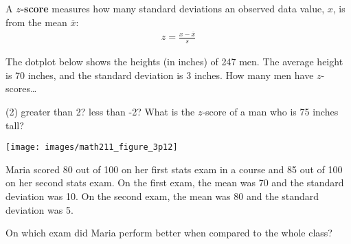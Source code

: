 \documentclass[../mathNotesPreamble]{subfiles}
\begin{document}
  \begin{defn*}
    A \textbf{$z$-score} measures how many standard deviations an observed data value, $x$, is from the mean $\overline{x}$:
    \begin{align*}
      z=\frac{x-\overline{x}}{s}
    \end{align*}
  \end{defn*}

  \begin{ex*}
    The dotplot below shows the heights (in inches) of 247 men. The average height is 70 inches, and the standard deviation is 3 inches. How many men have $z$-scores\dots
    \begin{tasks}[after-item-skip=\baselineskip, label=\textbullet](2)
      \task greater than 2?
      \task less than -2?
      \task* What is the $z$-score of a man who is 75 inches tall?
    \end{tasks}
  \end{ex*}
  \begin{center}
    \texttt{[image: images/math211\_figure\_3p12]}
  \end{center}
  \pagebreak

  \begin{ex*}
    Maria scored 80 out of 100 on her first stats exam in a course and 85 out of 100 on her second stats exam. On the first exam, the mean was 70 and the standard deviation was 10. On the second exam, the mean was 80 and the standard deviation was 5.

    On which exam did Maria perform better when compared to the whole class?
  \end{ex*}

  \pagebreak
\end{document}
